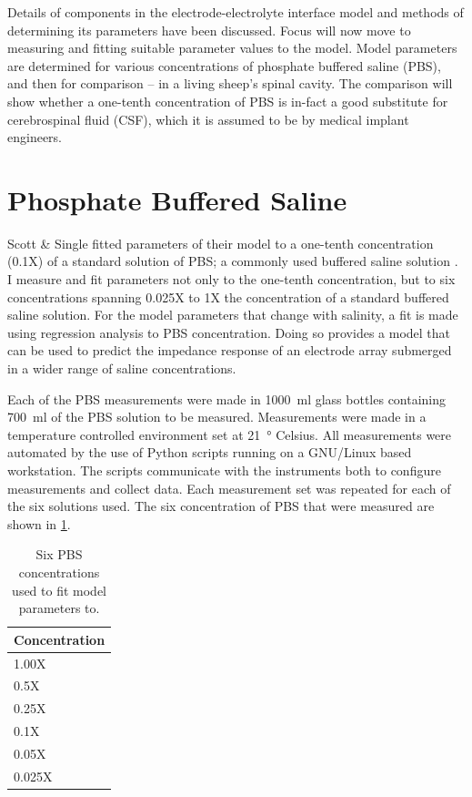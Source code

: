
Details of components in the electrode-electrolyte interface model and methods of determining its parameters have been discussed.
Focus will now move to measuring and fitting suitable parameter values to the model.
Model parameters are determined for various concentrations of phosphate buffered saline (PBS), and then for comparison -- in a living sheep's spinal cavity.
The comparison will show whether a one-tenth concentration of PBS is in-fact a good substitute for cerebrospinal fluid (CSF), which it is assumed to be by medical implant engineers.

\section{Phosphate Buffered Saline}
\label{sect:pbs_measurements}

    Scott \& Single fitted parameters of their model to a one-tenth concentration (0.1X) of a standard solution of PBS; a commonly used buffered saline solution \cite{Scott2014}.
    I measure and fit parameters not only to the one-tenth concentration, but to six concentrations spanning 0.025X to 1X the concentration of a standard buffered saline solution.
    For the model parameters that change with salinity, a fit is made using regression analysis to PBS concentration.
    Doing so provides a model that can be used to predict the impedance response of an electrode array submerged in a wider range of saline concentrations.

    Each of the PBS measurements were made in \SI{1000}{\milli\litre} glass bottles containing \SI{700}{\milli\litre} of the PBS solution to be measured.
    Measurements were made in a temperature controlled environment set at \SI{21}{\degree} Celsius.
    All measurements were automated by the use of Python scripts running on a GNU/Linux based workstation.
    The scripts communicate with the instruments both to configure measurements and collect data.
    Each measurement set was repeated for each of the six solutions used.
    The six concentration of PBS that were measured are shown in \cref{tab:pt2-PBS_concentrations}.
    \begin{table}
      \centering
      \begin{tabular}{l}
        Concentration\\
        \hline
        1.00X\\
        0.5X\\
        0.25X\\
        0.1X\\
        0.05X\\
        0.025X\\
      \end{tabular}
      \caption{\label{tab:pt2-PBS_concentrations}Six PBS concentrations used to fit model parameters to.}
    \end{table}

